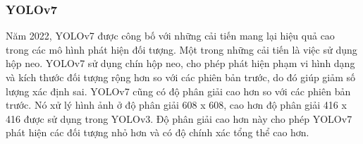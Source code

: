 \documentclass[../the.tex]{subfiles}
\begin{document}









\subsubsection{YOLOv7}
\label{sec:yolov7}
{\fontsize{13}{12} \selectfont

	Năm 2022, YOLOv7 \cite{wang2022yolov7} được công bố với những cải tiến mang lại hiệu quả cao trong các mô hình phát hiện đối tượng. Một trong những cải tiến là việc sử dụng hộp neo.
	YOLOv7 sử dụng chín hộp neo, cho phép phát hiện phạm vi hình dạng và kích thước đối tượng rộng hơn so với các phiên bản trước, do đó giúp giảm số lượng xác định sai.
	YOLOv7 cũng có độ phân giải cao hơn so với các phiên bản trước. Nó xử lý hình ảnh ở độ phân giải 608 x 608, cao hơn độ phân giải 416 x 416 được sử dụng trong YOLOv3. Độ phân giải cao hơn này cho phép YOLOv7 phát hiện các đối tượng nhỏ hơn và có độ chính xác tổng thể cao hơn.

}

\bigskip
\end{document}
